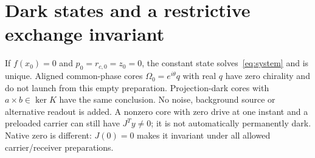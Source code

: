 \section{Dark states and a restrictive exchange invariant}\label{sec:capacity}
If $f(x_0)=0$ and $p_0=r_{c,0}=z_0=0$, the constant state solves~\eqref{eq:system} and is unique. Aligned common-phase cores $\Omega_0=e^{i\theta}q$ with real $q$ have zero chirality and do not launch from this empty preparation. Projection-dark cores with $a\times b\in\ker K$ have the same conclusion. No noise, background source or alternative readout is added. A nonzero core with zero drive at one instant and a preloaded carrier can still have $J^Ty\ne0$; it is not automatically permanently dark. Native zero is different: $J(0)=0$ makes it invariant under all allowed carrier/receiver preparations.


